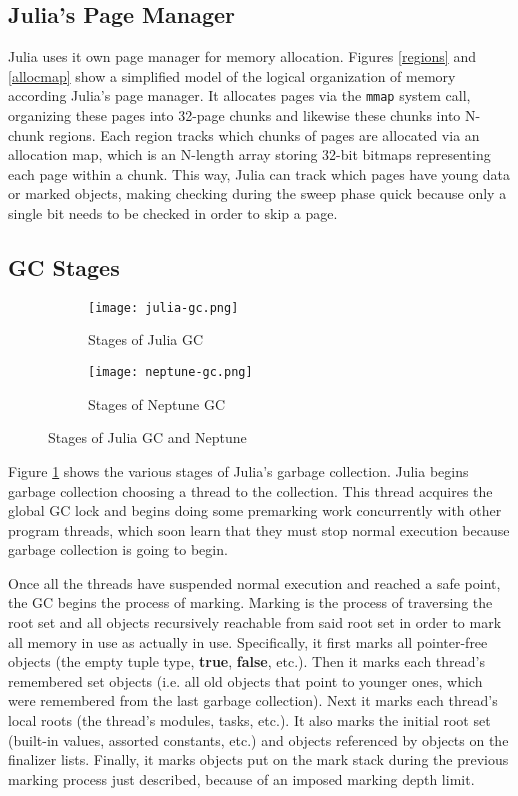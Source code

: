 \subsection{Julia's Page Manager}
Julia uses it own page manager for memory allocation.
Figures \ref{regions} and \ref{allocmap} show a simplified model of the logical organization of memory according Julia's page manager.
It allocates pages via the \texttt{mmap} system call, organizing these pages into 32-page chunks and likewise these chunks into N-chunk regions.
Each region tracks which chunks of pages are allocated via an allocation map, which is an N-length array storing 32-bit bitmaps representing each page within a chunk.
This way, Julia can track which pages have young data or marked objects, making checking during the sweep phase quick because only a single bit needs to be checked in order to skip a page.

\subsection{GC Stages}
\begin{figure}[h]
  \centering
  \begin{subfigure}{0.45\textwidth}
    \texttt{[image: julia-gc.png]}
    \caption{Stages of Julia GC}
    \label{fig:stages:jl}
  \end{subfigure}
  \begin{subfigure}{0.45\textwidth}
    \texttt{[image: neptune-gc.png]}
    \caption{Stages of Neptune GC}
    \label{fig:stages:np}
  \end{subfigure}
  \caption{Stages of Julia GC and Neptune}
  \label{fig:stages}
\end{figure}

Figure \ref{fig:stages:jl} shows the various stages of Julia's garbage collection.
Julia begins garbage collection choosing a thread to the collection.
This thread acquires the global GC lock and begins doing some premarking work concurrently with other program threads, which soon learn that they must stop normal execution because garbage collection is going to begin.

Once all the threads have suspended normal execution and reached a safe point, the GC begins the process of marking.
Marking is the process of traversing the root set and all objects recursively reachable from said root set in order to mark all memory in use as actually in use.
Specifically, it first marks all pointer-free objects (the empty tuple type, \textbf{true}, \textbf{false}, etc.).
Then it marks each thread's remembered set objects (i.e. all old objects that point to younger ones, which were remembered from the last garbage collection).
Next it marks each thread's local roots (the thread's modules, tasks, etc.).
It also marks the initial root set (built-in values, assorted constants, etc.) and objects referenced by objects on the finalizer lists.
Finally, it marks objects put on the mark stack during the previous marking process just described, because of an imposed marking depth limit.

